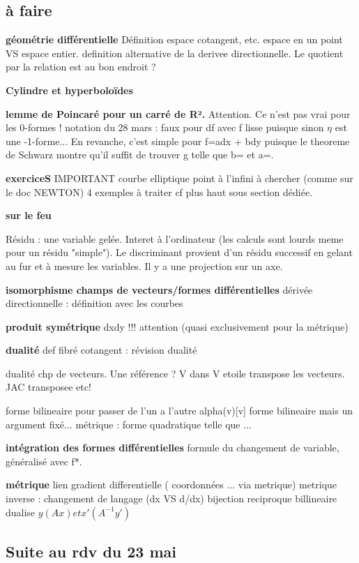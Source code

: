 \documentclass{article}
\theoremstyle{definition} %
\newcommand{\1}{\mathbb{1}} %
\begin{document}
\subsection{à faire}

\textbf{géométrie différentielle}
Définition espace cotangent, etc.
espace en un point VS espace entier.
definition alternative de la derivee directionnelle.
Le quotient par la relation est au bon endroit ?

\textbf{Cylindre et hyperboloïdes}



\textbf{lemme de Poincaré pour un carré de R².} 
Attention. Ce n'est pas vrai pour les 0-formes !
notation du 28 mars : faux pour df avec f lisse puisque sinon $\eta$ est une -1-forme...
En revanche, c'est simple pour f=adx + bdy puisque le theoreme de Schwarz montre qu'il suffit de trouver g telle que b= et a=.


\textbf{exerciceS}
IMPORTANT courbe elliptique point à l'infini à chercher 
(comme sur le doc NEWTON)
4 exemples à traiter cf plus haut sous section dédiée.


\textbf{sur le feu}

Résidu : une variable gelée.
Interet à l'ordinateur (les calculs sont lourds meme pour un résidu "simple"). Le discriminant provient d'un résidu successif en gelant au fur et à mesure les variables. Il y a une projection sur un axe.

\textbf{isomorphisme champs de vecteurs/formes différentielles}
dérivée directionnelle : définition avec les courbes

\textbf{produit symétrique} dxdy !!! attention (quasi exclusivement pour la métrique)

\textbf{dualité}
def fibré cotangent : révision dualité

dualité chp de vecteurs. Une référence ?
V dans V etoile transpose les vecteurs. JAC transposee etc!

forme bilineaire pour passer de l'un a l'autre alpha(v)[v]
forme bilineaire mais un argument fixé...
métrique : forme quadratique telle que ...

\textbf{intégration des formes différentielles}
formule du changement de variable, généralisé avec f*.

\textbf{métrique}
lien gradient differentielle ( coordonnées ... via metrique)
metrique inverse : changement de langage (dx VS d/dx)
bijection reciproque billineaire dualise $y(Ax) et x'(A^{-1} y')$

\subsection{Suite au rdv du 23 mai}
\end{document}
